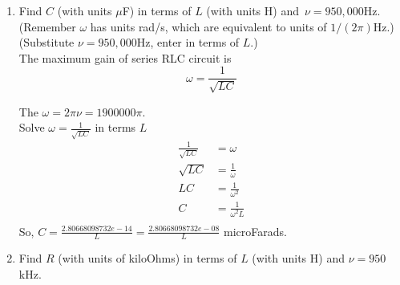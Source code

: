 \begin{enumerate}
\item Find $C$ (with units $\mu$F) in terms of $L$ (with units H) and $\, \nu =950,000$Hz.
  (Remember $\omega$ has units rad/s, which are equivalent to units of $1/(2\pi)$Hz.)\\

  (Substitute $\nu=950,000$Hz, enter in terms of $L$.)\\

  The maximum gain of series RLC circuit is
  \begin{equation*}
    \omega = \frac{1}{\sqrt{LC}}
  \end{equation*}

  The $\omega = 2 \pi \nu  = 1900000 \pi$.\\
  Solve $ \omega = \frac{1}{\sqrt{LC}} $ in terms $L$
  \begin{align*}
    \frac{1}{\sqrt{LC}} &= \omega  \\
    \sqrt{LC} &= \frac{1}{\omega} \\
    LC &= \frac{1}{\omega^2} \\
    C &= \frac{1}{\omega^2 L} \\
  \end{align*}
  So, $C = \frac{2.80668098732e-14}{L} = \frac{2.80668098732e-08}{L}$ microFarads.

\item Find $R$ (with units of kiloOhms) in terms of $L$ (with units H) and $\nu=950$kHz. \\


\end{enumerate}
